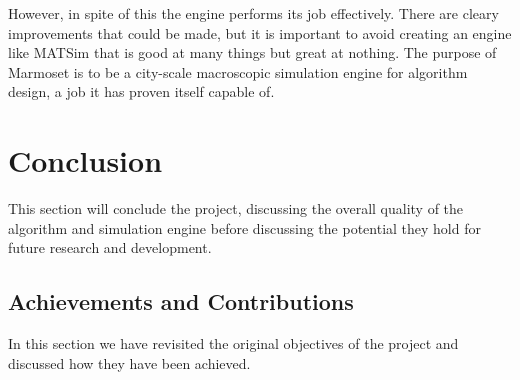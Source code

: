 \documentclass[ %
                    author={Alexander Hill},
                supervisor={Dr. Benjamin Sach},
                    degree={MEng},
                     title={MARMOSET},
                  subtitle={Multi-Agent Route Management using Online Simulation for Efficient Transportation},
                      type={research},
                      year={2016} ]{dissertation}
\begin{document}
However, in spite of this the engine performs its job effectively. There are
cleary improvements that could be made, but it is important to avoid creating
an engine like MATSim that is good at many things but great at nothing. The
purpose of Marmoset is to be a city-scale macroscopic simulation engine for
algorithm design, a job it has proven itself capable of.


\chapter{Conclusion}
\label{chap:conclusion}

This section will conclude the project, discussing the overall quality of the
algorithm and simulation engine before discussing the potential they hold for
future research and development.

\section{Achievements and Contributions}

In this section we have revisited the original objectives of the project and
discussed how they have been achieved.
\end{document}
